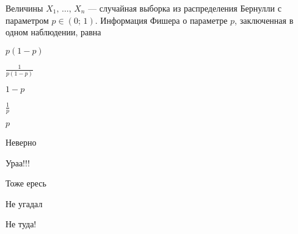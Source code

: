 
\begin{question}
Величины \(X_1, \, \ldots, \, X_n\) --- случайная выборка из
распределения Бернулли с параметром \(p \in (0;\,1)\). Информация Фишера
о параметре \(p\), заключенная в одном наблюдении, равна
\begin{answerlist}
  \item \(p(1-p)\)
  \item \(\frac{1}{p(1-p)}\)
  \item \(1 - p\)
  \item \(\frac{1}{p}\)
  \item \(p\)
\end{answerlist}
\end{question}

\begin{solution}
\begin{answerlist}
  \item Неверно
  \item Ураа!!!
  \item Тоже ересь
  \item Не угадал
  \item Не туда!
\end{answerlist}
\end{solution}

